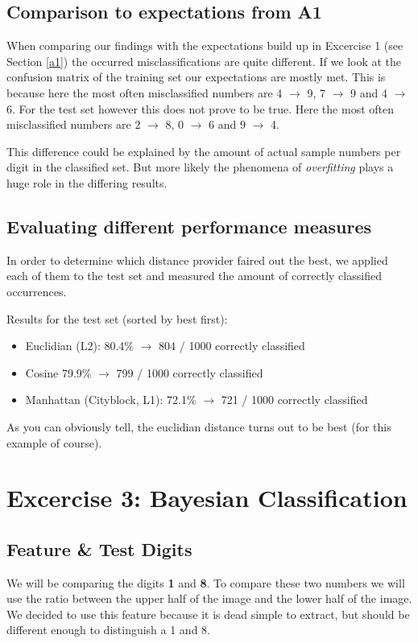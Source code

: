 \documentclass{article}
\begin{document}
\subsection{Comparison to expectations from A1}
When comparing our findings with the expectations build up in Excercise 1 (see Section \ref{a1}) the occurred misclassifications are quite different.
If we look at the confusion matrix of the training set our expectations are mostly met. This is because here the  most often misclassified numbers are 4 $\rightarrow$ 9, 7 $\rightarrow$ 9 and 4 $\rightarrow$ 6.
For the test set however this does not prove to be true. Here the most often misclassified numbers are 2 $\rightarrow$ 8, 0 $\rightarrow$ 6 and 9 $\rightarrow$ 4.

This difference could be explained by the amount of actual sample numbers per digit in the classified set.
But more likely the phenomena of \emph{overfitting} plays a huge role in the differing results.

\subsection{Evaluating different performance measures}
In order to determine which distance provider faired out the best, we applied each of them to the test set and measured the amount of correctly classified occurrences.

Results for the test set (sorted by best first):
\begin{itemize}
\item Euclidian (L2): 80.4\% $\rightarrow$ 804 / 1000 correctly classified
\item Cosine 79.9\% $\rightarrow$ 799 / 1000 correctly classified
\item Manhattan (Cityblock, L1): 72.1\% $\rightarrow$ 721 / 1000 correctly classified
\end{itemize}

As you can obviously tell, the euclidian distance turns out to be best (for this example of course).

\section{Excercise 3: Bayesian Classification}
\subsection{Feature \& Test Digits}
We will be comparing the digits \textbf{1} and \textbf{8}.
To compare these two numbers we will use the ratio between the upper half of the image and the lower half of the image. We decided to use this feature because it is dead simple to extract, but should be different enough to distinguish a 1 and 8.
\end{document}
